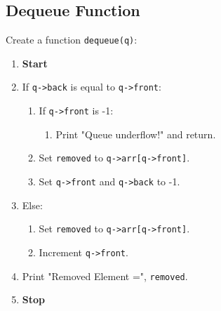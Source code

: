 {  \subsection{Dequeue Function}
  Create a function \texttt{dequeue(q)}:
  \begin{enumerate}[label=\arabic*:,left=0pt]
    \item \textbf{Start}
    \item If \texttt{q->back} is equal to \texttt{q->front}:
          \begin{enumerate}[label=2.\arabic*.]
            \item If \texttt{q->front} is -1:
                  \begin{enumerate}[label=2.1.\arabic*.]
                    \item Print "Queue underflow!" and return.
                  \end{enumerate}
            \item Set \texttt{removed} to \texttt{q->arr[q->front]}.
            \item Set \texttt{q->front} and \texttt{q->back} to -1.
          \end{enumerate}
    \item Else:
          \begin{enumerate}[label=2.\arabic*.]
            \item Set \texttt{removed} to \texttt{q->arr[q->front]}.
            \item Increment \texttt{q->front}.
          \end{enumerate}
    \item Print "Removed Element =", \texttt{removed}.
    \item \textbf{Stop}
  \end{enumerate}

}
